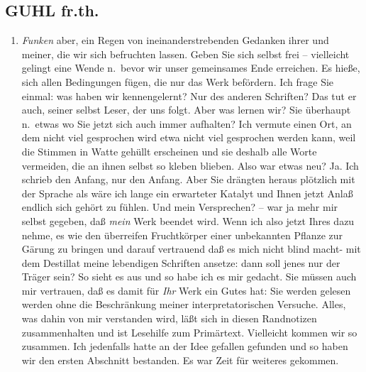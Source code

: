 \documentclass[
]{article}
\author{}
\date{\vspace{-2.5em}}
\providecommand{\tightlist}{%
  \setlength{\itemsep}{0pt}\setlength{\parskip}{0pt}}
\begin{document}
\subsection{GUHL fr.th.}\label{guhl-fr.th.}

\begin{enumerate}
\def\labelenumi{\alph{enumi}.}
\setcounter{enumi}{2}
\tightlist
\item
  \emph{Funken} aber, ein Regen von ineinanderstrebenden Gedanken ihrer
  und meiner, die wir sich befruchten lassen. Geben Sie sich selbst frei
  -- vielleicht gelingt eine Wende n.~bevor wir unser gemeinsames Ende
  erreichen. Es hieße, sich allen Bedingungen fügen, die nur das Werk
  befördern. Ich frage Sie einmal: was haben wir kennengelernt? Nur des
  anderen Schriften? Das tut er auch, seiner selbst Leser, der uns
  folgt. Aber was lernen wir? Sie überhaupt n.~etwas wo Sie jetzt sich
  auch immer aufhalten? Ich vermute einen Ort, an dem nicht viel
  gesprochen wird etwa nicht viel gesprochen werden kann, weil die
  Stimmen in Watte gehüllt erscheinen und sie deshalb alle Worte
  vermeiden, die an ihnen selbst so kleben blieben. Also war etwas neu?
  Ja. Ich schrieb den Anfang, nur den Anfang. Aber Sie drängten heraus
  plötzlich mit der Sprache als wäre ich lange ein erwarteter Katalyt
  und Ihnen jetzt Anlaß endlich sich gehört zu fühlen. Und mein
  Versprechen? -- war ja mehr mir selbst gegeben, daß \emph{mein} Werk
  beendet wird. Wenn ich also jetzt Ihres dazu nehme, es wie den
  überreifen Fruchtkörper einer unbekannten Pflanze zur Gärung zu
  bringen und darauf vertrauend daß es mich nicht blind macht- mit dem
  Destillat meine lebendigen Schriften ansetze: dann soll jenes nur der
  Träger sein? So sieht es aus und so habe ich es mir gedacht. Sie
  müssen auch mir vertrauen, daß es damit für \emph{Ihr} Werk ein Gutes
  hat: Sie werden gelesen werden ohne die Beschränkung meiner
  interpretatorischen Versuche. Alles, was dahin von mir verstanden
  wird, läßt sich in diesen Randnotizen zusammenhalten und ist Lesehilfe
  zum Primärtext. Vielleicht kommen wir so zusammen. Ich jedenfalls
  hatte an der Idee gefallen gefunden und so haben wir den ersten
  Abschnitt bestanden. Es war Zeit für weiteres gekommen.
\end{enumerate}
\end{document}
